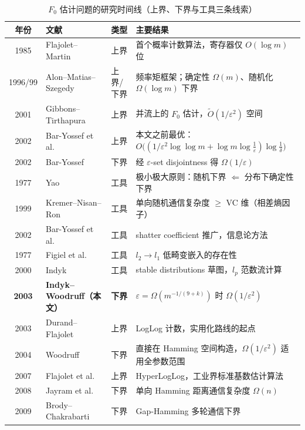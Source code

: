 \documentclass[UTF8, 11pt, a4paper, linestretch=1.15]{ctexart}
\theoremstyle{zhstyle}
\newcommand{\eps}{\varepsilon}
\newcommand{\Fzero}{F_0}
\begin{document}
	\begin{table}[htbp]
		\centering
		\small
		\renewcommand{\arraystretch}{1.18}
		\caption{$\Fzero$ 估计问题的研究时间线（上界、下界与工具三条线索）}
		\label{tab:timeline}
		\begin{tabularx}{\textwidth}{@{}c l l >{\raggedright\arraybackslash}X@{}}
			\toprule
			年份 & 文献 & 类型 & 主要结果 \\
			\midrule
			1985 & Flajolet--Martin~\cite{FM85} & 上界 & 首个概率计数算法，寄存器仅 $O(\log m)$ 位 \\
			1996/99 & Alon--Matias--Szegedy~\cite{AMS99} & 上界/下界 &
			频率矩框架；确定性 $\Omega(m)$、随机化 $\Omega(\log m)$ 下界 \\
			2001 & Gibbons--Tirthapura~\cite{GT01} & 上界 &
			并流上的 $\Fzero$ 估计，$\tilde{O}(1/\eps^2)$ 空间 \\
			2002 & Bar-Yossef et al.~\cite{BJKST02} & 上界 &
			本文之前最优：$O\big((1/\eps^2 \log\log m + \log m \log\frac{1}{\eps})\log\frac{1}{\delta}\big)$ \\
			2002 & Bar-Yossef~\cite{BarYossef02} & 下界 & 经 $\eps$-set disjointness 得 $\Omega(1/\eps)$ \\
			1977 & Yao~\cite{Yao77} & 工具 & 极小极大原则：随机下界 $\Leftarrow$ 分布下确定性下界 \\
			1999 & Kremer--Nisan--Ron~\cite{KNR99} & 工具 & 单向随机通信复杂度 $\geq$ VC 维（相差熵因子） \\
			2002 & Bar-Yossef et al.~\cite{BYJKS02} & 工具 & shatter coefficient 推广，信息论方法 \\
			1977 & Figiel et al.~\cite{FLM77} & 工具 & $l_2 \to l_1$ 低畸变嵌入的存在性 \\
			2000 & Indyk~\cite{Indyk00} & 工具 & stable distributions 草图，$l_p$ 范数流计算 \\
			\midrule
			\textbf{2003} & \textbf{Indyk--Woodruff（本文）} & \textbf{下界} &
			$\eps=\Omega(m^{-1/(9+k)})$ 时 $\Omega(1/\eps^2)$ \\
			\midrule
			2003 & Durand--Flajolet~\cite{DF03} & 上界 & LogLog 计数，实用化路线的起点 \\
			2004 & Woodruff~\cite{Woo04} & 下界 &
			直接在 Hamming 空间构造，$\Omega(1/\eps^2)$ 适用全参数范围 \\
			2007 & Flajolet et al.~\cite{HLL07} & 上界 & HyperLogLog，工业界标准基数估计算法 \\
			2008 & Jayram et al.~\cite{JKS08} & 下界 & 单向 Hamming 距离通信复杂度 $\Omega(n)$ \\
			2009 & Brody--Chakrabarti~\cite{BC09} & 下界 & Gap-Hamming 多轮通信下界 \\

\end{tabularx}
\end{table}
\end{document}
